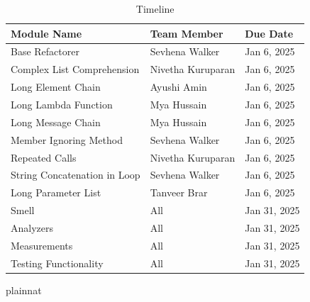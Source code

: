 \documentclass[12pt, titlepage]{article}
\begin{document}
\begin{table}[h!]
  \centering
  \caption{Timeline}
  \begin{tabular}{|l|l|l|}
  \hline
  \textbf{Module Name} & \textbf{Team Member}        & \textbf{Due Date} \\ \hline
  Base Refactorer                     & Sevhena Walker              & Jan 6, 2025    \\ \hline
  Complex List Comprehension          & Nivetha Kuruparan              & Jan 6, 2025    \\ \hline
  Long Element Chain                  & Ayushi Amin              & Jan 6, 2025     \\ \hline
  Long Lambda Function                & Mya Hussain              & Jan 6, 2025     \\ \hline
  Long Message Chain                  & Mya Hussain              & Jan 6, 2025     \\ \hline
  Member Ignoring Method              & Sevhena Walker             & Jan 6, 2025     \\ \hline
  Repeated Calls                      & Nivetha Kuruparan               & Jan 6, 2025     \\ \hline
  String Concatenation in Loop        & Sevhena Walker              & Jan 6, 2025     \\ \hline
  Long Parameter List                 & Tanveer Brar              & Jan 6, 2025     \\ \hline
  Smell                               & All             & Jan 31, 2025    \\ \hline
  Analyzers                           & All            & Jan 31, 2025      \\ \hline
  Measurements                        & All          & Jan 31, 2025      \\ \hline
  Testing Functionality               & All           & Jan 31, 2025      \\ \hline
  \end{tabular}
  \end{table}
  

 {plainnat}


\newpage{}
\end{document}
